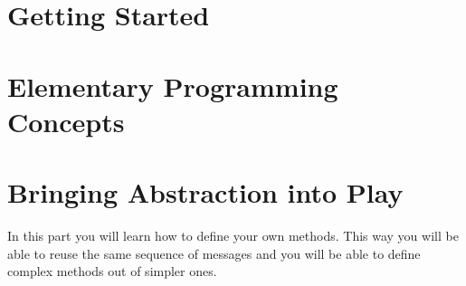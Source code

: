   

\part{Getting Started}






\part{Elementary Programming Concepts}









\part{Bringing Abstraction into Play}
In this part you will learn how to define your own methods. This way you will be able to reuse the same sequence of messages and  you will be able to define complex methods out of simpler ones.




